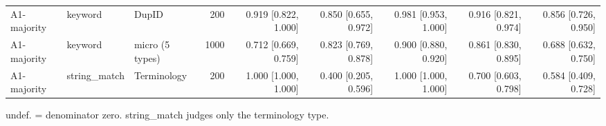 \begin{table}[t]
\begin{tabular}{lllrrrrrr}
A1-majority & keyword & DupID & 200 & 0.919 [0.822, 1.000] & 0.850 [0.655, 0.972] & 0.981 [0.953, 1.000] & 0.916 [0.821, 0.974] & 0.856 [0.726, 0.950] \\
A1-majority & keyword & micro (5 types) & 1000 & 0.712 [0.669, 0.759] & 0.823 [0.769, 0.878] & 0.900 [0.880, 0.920] & 0.861 [0.830, 0.895] & 0.688 [0.632, 0.750] \\
A1-majority & string\_match & Terminology & 200 & 1.000 [1.000, 1.000] & 0.400 [0.205, 0.596] & 1.000 [1.000, 1.000] & 0.700 [0.603, 0.798] & 0.584 [0.409, 0.728] \\
\bottomrule
\end{tabular}
\par\footnotesize undef. = denominator zero. string\_match judges only the terminology type.
\end{table}
